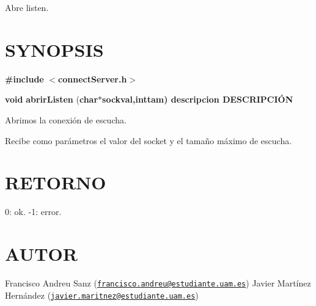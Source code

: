 Abre listen.\hypertarget{unknown_case_SYNOPSIS}{}\section{S\-Y\-N\-O\-P\-S\-I\-S}\label{unknown_case_SYNOPSIS}
{\bfseries \#include} {\bfseries $<$connect\-Server.\-h$>$} 

{\bfseries void} {\bfseries abrir\-Listen} {\bfseries }({\bfseries char{\bfseries $\ast${\bfseries sockval{\bfseries },{\bfseries int{\bfseries tam{\bfseries })}  } } descripcion} D\-E\-S\-C\-R\-I\-P\-C\-IÓ\-N} 

Abrimos la conexión de escucha.

Recibe como parámetros el valor del socket y el tamaño máximo de escucha.\hypertarget{unknown_case_retorno}{}\section{R\-E\-T\-O\-R\-N\-O}\label{unknown_case_retorno}
0\-: ok. -\/1\-: error.\hypertarget{unknown_case_authors}{}\section{A\-U\-T\-O\-R}\label{unknown_case_authors}
Francisco Andreu Sanz (\href{mailto:francisco.andreu@estudiante.uam.es}{\tt francisco.\-andreu@estudiante.\-uam.\-es}) Javier Martínez Hernández (\href{mailto:javier.maritnez@estudiante.uam.es}{\tt javier.\-maritnez@estudiante.\-uam.\-es}) 